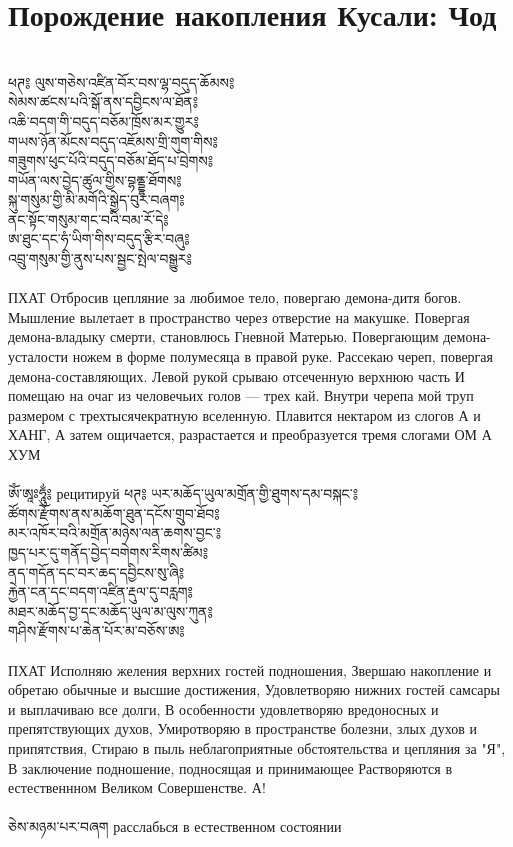 \ru
\section{Порождение накопления Кусали: Чод}
\\
\ti
ཕཊ༔ ལུས་གཅེས་འཛིན་བོར་བས་ལྷ་བདུད་ཆོམས༔\\
སེམས་ཚངས་པའི་སྒོ་ནས་དབྱིངས་ལ་ཐོན༔\\
འཆི་བདག་གི་བདུད་བཅོམ་ཁྲོས་མར་གྱུར༔\\
གཡས་ཉོན་མོངས་བདུད་འཇོམས་གྲི་གུག་གིས༔\\
གཟུགས་ཕུང་པོའི་བདུད་བཅོམ་ཐོད་པ་བྲེགས༔\\
གཡོན་ལས་བྱེད་ཚུལ་གྱིས་བྷནྡྷ་ཐོགས༔\\
སྐུ་གསུམ་གྱི་མི་མགོའི་སྒྱེད་བུར་བཞག༔\\
ནང་སྟོང་གསུམ་གང་བའི་བམ་རོ་དེ༔\\
ཨ་ཐུང་དང་ཧཾ་ཡིག་གིས་བདུད་རྩིར་བཞུ༔\\
འབྲུ་གསུམ་གྱི་ནུས་པས་སྦྱང་སྤེལ་བསྒྱུར༔\\
\\
\ru
ПХАТ Отбросив цепляние за любимое тело, повергаю демона-дитя богов.
Мышление вылетает в пространство через отверстие на макушке.
Повергая демона-владыку смерти, становлюсь Гневной Матерью.
Повергающим демона-усталости ножем в форме полумесяца в правой руке.
Рассекаю череп, повергая демона-составляющих.
Левой рукой срываю отсеченную верхнюю часть
И помещаю на очаг из человечьих голов — трех кай.
Внутри черепа мой труп размером с трехтысячекратную вселенную.
Плавится нектаром из слогов А и ХАНГ,
А затем ощичается, разрастается и преобразуется тремя слогами ОМ А ХУМ\\
\\
\ti
ཨོཾ་ཨཱཿཧཱུྂ༔
\ru рецитируй
\newpage
\ti
ཕཊ༔ ཡར་མཆོད་ཡུལ་མགྲོན་གྱི་ཐུགས་དམ་བསྐང་༔\\
ཚོགས་རྫོགས་ནས་མཆོག་ཐུན་དངོས་གྲུབ་ཐོབ༔\\
མར་འཁོར་བའི་མགྲོན་མཉེས་ལན་ཆགས་བྱང་༔\\
ཁྱད་པར་དུ་གནོད་བྱེད་བགེགས་རིགས་ཚིམ༔\\
ནད་གདོན་དང་བར་ཆད་དབྱིངས་སུ་ཞི༔\\
རྐྱེན་ངན་དང་བདག་འཛིན་རྡུལ་དུ་བརླག༔\\
མཐར་མཆོད་བྱ་དང་མཆོད་ཡུལ་མ་ལུས་ཀུན༔\\
གཤིས་རྫོགས་པ་ཆེན་པོར་མ་བཅོས་ཨ༔\\
\\
\ru
ПХАТ Исполняю желения верхних гостей подношения,
Звершаю накопление и обретаю обычные и высшие достижения,
Удовлетворяю нижних гостей самсары и выплачиваю все долги,
В особенности удовлетворяю вредоносных и препятствующих духов,
Умиротворяю в пространстве болезни, злых духов и припятствия,
Стираю в пыль неблагоприятные обстоятельства и цепляния за "Я",
В заключение подношение, подносящая и принимающее
Растворяются в естественнном Великом Совершенстве. А!\\
\\
\ti
ཅེས་མཉམ་པར་བཞག \ru расслабься в естественном состоянии
